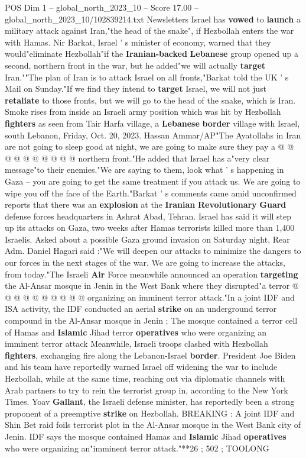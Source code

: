 \begin{textsample}{POS Dim 1 – global\_north\_2023\_10 – Score 17.00 – global\_north\_2023\_10/102839214.txt}  \label{ex:f1_pos_149}
Newsletters Israel has \textbf{vowed} to \textbf{launch} a military attack against Iran,"the head of the snake", if Hezbollah enters the war with Hamas.
Nir Barkat, Israel ' s minister of economy, warned that they would"eliminate Hezbollah"if the \textbf{Iranian-backed} \textbf{Lebanese} group opened up a second, northern front in the war, but he added"we will actually \textbf{target} Iran.""The plan of Iran is to attack Israel on all fronts,"Barkat told the UK ' s Mail on Sunday."If we find they intend to \textbf{target} Israel, we will not just \textbf{retaliate} to those fronts, but we will go to the head of the snake, which is Iran.
Smoke rises from inside an Israeli army position which was hit by Hezbollah \textbf{fighters} as seen from Tair Harfa village, a \textbf{Lebanese} \textbf{border} village with Israel, south Lebanon, Friday, Oct. 20, 2023.
Hassan Ammar/AP"The Ayatollahs in Iran are not going to sleep good at night, we are going to make sure they pay a @ @ @ @ @ @ @ @ @ @ northern front."He added that Israel has a"very clear message"to their enemies."We are saying to them, look what ' s happening in Gaza -- you are going to get the same treatment if you attack us.
We are going to wipe you off the face of the Earth."Barkat ' s comments came amid unconfirmed reports that there was an \textbf{explosion} at the \textbf{Iranian} \textbf{Revolutionary} \textbf{Guard} defense forces headquarters in Ashrat Abad, Tehran.
Israel has said it will step up its attacks on Gaza, two weeks after Hamas terrorists killed more than 1,400 Israelis.
Asked about a possible Gaza ground invasion on Saturday night, Rear Adm.
Daniel Hagari said :"We will deepen our attacks to minimize the dangers to our forces in the next stages of the war.
We are going to increase the attacks, from today."The Israeli \textbf{Air} Force meanwhile announced an operation \textbf{targeting} the Al-Ansar mosque in Jenin in the West Bank where they disrupted"a terror @ @ @ @ @ @ @ @ @ @ organizing an imminent terror attack."In a joint IDF and ISA activity, the IDF conducted an aerial \textbf{strike} on an underground terror compound in the Al-Ansar mosque in Jenin ; The mosque contained a terror cell of Hamas and \textbf{Islamic} Jihad terror \textbf{operatives} who were organizing an imminent terror attack Meanwhile, Israeli troops clashed with Hezbollah \textbf{fighters}, exchanging fire along the Lebanon-Israel \textbf{border}.
President Joe Biden and his team have reportedly warned Israel off widening the war to include Hezbollah, while at the same time, reaching out via diplomatic channels with Arab partners to try to rein the terrorist group in, according to the New York Times.
Yoav \textbf{Gallant}, the Israeli defense minister, has reportedly been a strong proponent of a preemptive \textbf{strike} on Hezbollah.
BREAKING : A joint IDF and Shin Bet raid foils terrorist plot in the Al-Ansar mosque in the West Bank city of Jenin.
IDF says the mosque contained Hamas and \textbf{Islamic} Jihad \textbf{operatives} who were organizing an"imminent terror attack."**26 ; 502 ; TOOLONG


\end{textsample}

